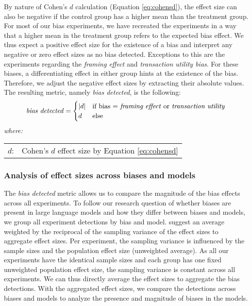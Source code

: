 \par By nature of Cohen's $d$ calculation (Equation \ref{eq:cohensd}), the effect size can also be negative if the control group has a higher mean than the treatment group. For most of our bias experiments, we have recreated the experiments in a way that a higher mean in the treatment group refers to the expected bias effect. We thus expect a positive effect size for the existence of a bias and interpret any negative or zero effect sizes as no bias detected. Exceptions to this are the experiments regarding the \textit{framing effect} and \textit{transaction utility bias}. For these biases, a differentiating effect in either group hints at the existence of the bias. Therefore, we adjust the negative effect sizes by extracting their absolute values. The resulting metric, namely \textit{bias detected}, is the following:
\begin{equation} \label{eq:bias_detected}
    \text{\textit{bias detected}} =
    \begin{cases}
        |d| & \text{if bias = \textit{framing effect} or \textit{transaction utility}} \\
        d & \text{else}
    \end{cases}
\end{equation}
\hspace{0.5cm} \textit{where:} \\
\hspace*{3em}
\begin{tabular}{rl}
    $d$:& Cohen's $d$ effect size by Equation \ref{eq:cohensd}
\end{tabular}

\subsubsection{Analysis of effect sizes across biases and models}
\label{methodologies:analysisbiasmodels}
\par The \textit{bias detected} metric allows us to compare the magnitude of the bias effects across all experiments. To follow our research question of whether biases are present in large language models and how they differ between biases and models, we group all experiment detections by bias and model. \textcite{morris2002combining} suggest an average weighted by the reciprocal of the sampling variance of the effect sizes to aggregate effect sizes. Per experiment, the sampling variance is influenced by the sample sizes and the population effect size (unweighted average). As all our experiments have the identical sample sizes and each group has one fixed unweighted population effect size, the sampling variance is constant across all experiments. We can thus directly average the effect sizes to aggregate the bias detections. With the aggregated effect sizes, we compare the detections across biases and models to analyze the presence and magnitude of biases in the models.

